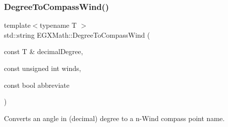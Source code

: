 \mbox{\label{group___e_g_x_math-_conversions-_angle_conversions-_degree_ga5ffef873bcec300ab90570ad6e7b1ab1}} 
\subsubsection{\texorpdfstring{Degree\+To\+Compass\+Wind()}{DegreeToCompassWind()}}
{\footnotesize\ttfamily template$<$typename T $>$ \\
std\+::string E\+G\+X\+Math\+::\+Degree\+To\+Compass\+Wind (\begin{DoxyParamCaption}\item[{const T \&}]{decimal\+Degree,  }\item[{const unsigned int}]{winds,  }\item[{const bool}]{abbreviate }\end{DoxyParamCaption})}



Converts an angle in (decimal) degree to a n-\/\+Wind compass point name. 

